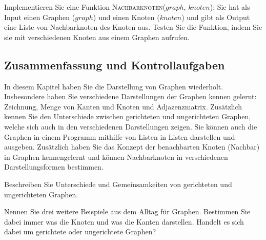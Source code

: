 \begin{aufg}
Implementieren Sie eine Funktion \textsc{Nachbarknoten($graph$, $knoten$)}: Sie hat als Input einen Graphen ($graph$) und einen Knoten ($knoten$) und gibt als Output eine Liste von Nachbarknoten des Knoten aus. Testen Sie die Funktion, indem Sie sie mit verschiedenen Knoten aus einem Graphen aufrufen.
\end{aufg}

\subsection{Zusammenfassung und Kontrollaufgaben}

In diesem Kapitel haben Sie die Darstellung von Graphen wiederholt. 
Insbesondere haben Sie verschiedene Darstellungen der Graphen kennen gelernt: Zeichnung, Menge von Kanten und Knoten und Adjazenzmatrix.
Zusätzlich kennen Sie den Unterschiede zwischen gerichteten und ungerichteten Graphen, welche sich auch in den verschiedenen Darstellungen zeigen. 
Sie können auch die Graphen in einem Programm mithilfe von Listen in Listen darstellen und ausgeben. 
Zusätzlich haben Sie das Konzept der benachbarten Knoten (Nachbar) in Graphen kennengelernt und können Nachbarknoten in verschiedenen Darstellungsformen bestimmen. 



\begin{kontr}
Beschreiben Sie Unterschiede und Gemeinsamkeiten von gerichteten und ungerichteten Graphen.
\end{kontr}


\begin{kontr}
Nennen Sie drei weitere Beispiele aus dem Alltag für Graphen. 
Bestimmen Sie dabei immer was die Knoten und was die Kanten darstellen. 
Handelt es sich dabei um gerichtete oder ungerichtete Graphen?
\end{kontr}


